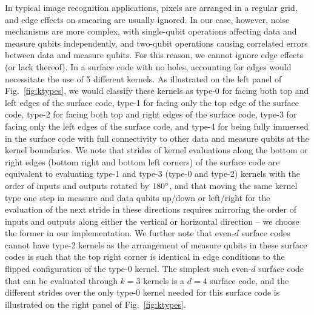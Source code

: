 In typical image recognition applications, pixels are arranged in a regular grid, and edge effects on smearing are usually ignored. In our case, however, noise mechanisms are more complex, with single-qubit operations affecting data and measure qubits independently, and two-qubit operations causing correlated errors between data and measure qubits. For this reason, we cannot ignore edge effects (or lack thereof). In a surface code with no holes, accounting for edges would necessitate the use of 5 different kernels. As illustrated on the left panel of Fig.~\ref{fig:ktypes}, we would classify these kernels as type-0 for facing both top and left edges of the surface code, type-1 for facing only the top edge of the surface code, type-2 for facing both top and right edges of the surface code, type-3 for facing only the left edges of the surface code, and type-4 for being fully immersed in the surface code with full connectivity to other data and measure qubits at the kernel boundaries. We note that strides of kernel evaluations along the bottom or right edges (bottom right and bottom left corners) of the surface code are equivalent to evaluating type-1 and type-3 (type-0 and type-2) kernels with the order of inputs and outputs rotated by $180^\circ$, and that moving the same kernel type one step in measure and data qubits up/down or left/right for the evaluation of the next stride in these directions requires mirroring the order of inputs and outputs along either the vertical or horizontal direction -- we choose the former in our implementation. We further note that even-$d$ surface codes cannot have type-2 kernels as the arrangement of measure qubits in these surface codes is such that the top right corner is identical in edge conditions to the flipped configuration of the type-0 kernel. The simplest such even-$d$ surface code that can be evaluated through $k=3$ kernels is a $d=4$ surface code, and the different strides over the only type-0 kernel needed for this surface code is illustrated on the right panel of Fig.~\ref{fig:ktypes}.

